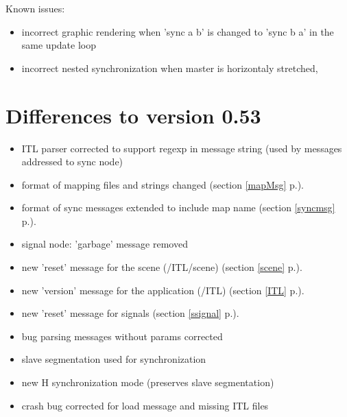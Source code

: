 \documentclass[a4paper,twoside]{report}
\newcommand{\sublevel}[1]	{\section{#1}}
\newcommand{\fullref}[1]	{\ref{#1} p.\pageref{#1}}
\begin{document}
Known issues: 
\begin{itemize}
\item incorrect graphic rendering when 'sync a b' is changed to 'sync b a' in the same update loop
\item incorrect nested synchronization when master is horizontaly stretched,
\end{itemize}

\sublevel{Differences to version 0.53}
\begin{itemize}
\item ITL parser corrected to support regexp in message string (used by messages addressed to sync node)
\item format of mapping files and strings changed (section \fullref{mapMsg}).
\item format of sync messages extended to include map name (section \fullref{syncmsg}).
\item signal node: 'garbage' message removed
\item new 'reset' message for the scene (/ITL/scene) (section \fullref{scene}).
\item new 'version' message for the application (/ITL) (section \fullref{ITL}).
\item new 'reset' message for signals (section \fullref{ssignal}).
\item bug parsing messages without params corrected
\item slave segmentation used for synchronization
\item new H synchronization mode (preserves slave segmentation)
\item crash bug corrected for load message and missing ITL files
\end{itemize}
\end{document}
